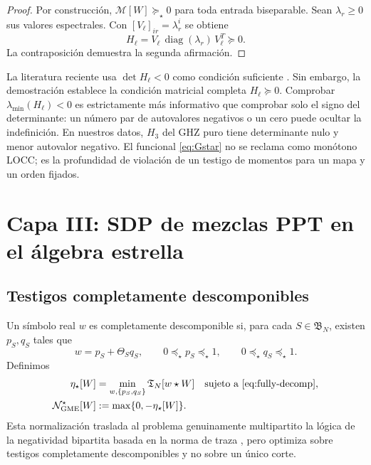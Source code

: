 \documentclass[11pt,a4paper]{article}
\newcommand{\Tfun}{\mathfrak T}
\newcommand{\Ngstar}{\mathcal N_{\mathrm{GME}}^{\star}}
\newcommand{\starprod}{\star}
\theoremstyle{definition}
\begin{document}
\begin{proof}
Por construcción, $\mathcal M[W]\succeq_\star0$ para toda entrada biseparable.
Sean $\lambda_r\geq0$ sus valores espectrales. Con
$[V_\ell]_{ir}=\lambda_r^i$ se obtiene
\begin{equation}
 H_\ell=V_\ell\,\operatorname{diag}(\lambda_r)\,V_\ell^T\succeq0.
\end{equation}
La contraposición demuestra la segunda afirmación.
\end{proof}

La literatura reciente usa $\det H_\ell<0$ como condición suficiente
\cite{Mukherjee2025GMEMoments}. Sin embargo, la demostración establece la
condición matricial completa $H_\ell\succeq0$. Comprobar
$\lambda_{\min}(H_\ell)<0$ es estrictamente más informativo que comprobar solo
el signo del determinante: un número par de autovalores negativos o un cero
puede ocultar la indefinición. En nuestros datos, $H_3$ del GHZ puro tiene
determinante nulo y menor autovalor negativo. El funcional
\eqref{eq:Gstar} no se reclama como monótono LOCC; es la profundidad de violación
de un testigo de momentos para un mapa y un orden fijados.

\section{Capa III: SDP de mezclas PPT en el álgebra estrella}

\subsection{Testigos completamente descomponibles}

Un símbolo real $w$ es completamente descomponible si, para cada
$S\in\mathfrak B_N$, existen $p_S,q_S$ tales que
\begin{equation}
 w=p_S+\Theta_Sq_S,
 \qquad
 0\preceq_\star p_S\preceq_\star1,
 \qquad
 0\preceq_\star q_S\preceq_\star1.
 \label{eq:fully-decomp}
\end{equation}
Definimos
\begin{align}
 \eta_\star[W]
 &=\min_{w,\{p_S,q_S\}}
 \Tfun_N[w\starprod W]
 \quad\text{sujeto a \eqref{eq:fully-decomp}},\label{eq:eta-sdp}\\
 \Ngstar[W]&:=\max\{0,-\eta_\star[W]\}.
 \label{eq:Ngstar}
\end{align}
Esta normalización traslada al problema genuinamente multipartito la lógica de
la negatividad bipartita basada en la norma de traza
\cite{VidalWerner2002Negativity}, pero optimiza sobre testigos completamente
descomponibles y no sobre un único corte.
\end{document}
